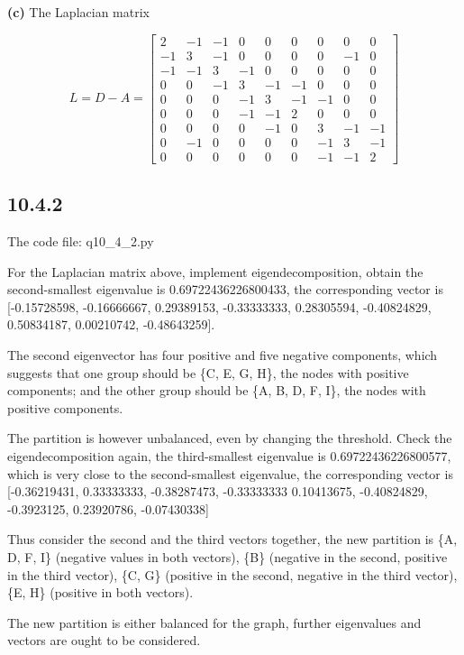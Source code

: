 \documentclass[a4paper, 11pt]{article}
\begin{document}
\textbf{(c)} The Laplacian matrix

$$L = D - A = \begin{bmatrix}
2 &  -1 & -1 & 0 & 0 & 0 & 0 & 0 & 0 \\
-1 & 3 & -1 & 0 & 0 & 0 & 0 & -1 & 0 \\
-1 & -1 & 3 & -1 & 0 & 0 & 0 & 0 & 0 \\
0 & 0 & -1 & 3 & -1 & -1 & 0 & 0 & 0 \\
0 & 0 & 0 & -1 & 3 & -1 & -1 & 0 & 0 \\
0 & 0 & 0 & -1 & -1 & 2 & 0 & 0 & 0 \\
0 & 0 & 0 & 0 & -1 & 0 & 3 & -1 & -1 \\
0 & -1 & 0 & 0 & 0 & 0 & -1 & 3 & -1 \\
0 & 0 & 0 & 0 & 0 & 0 & -1 & -1 & 2
\end{bmatrix}$$


\subsection*{10.4.2} 

The code file: q10\_4\_2.py

For the Laplacian matrix above, implement eigendecomposition, obtain the second-smallest eigenvalue is  0.69722436226800433, the corresponding vector is  [-0.15728598, -0.16666667, 0.29389153, -0.33333333, 0.28305594, -0.40824829,  0.50834187,  0.00210742, -0.48643259].

The second eigenvector has four positive and five negative components, which suggests that one group should be \{C, E, G, H\}, the nodes with positive components; and the other group should be \{A, B, D, F, I\}, the nodes with positive components. 

The partition is however unbalanced, even by changing the threshold. Check the eigendecomposition again, the third-smallest eigenvalue is 0.69722436226800577, which is very close to the second-smallest eigenvalue, the corresponding vector is [-0.36219431,  0.33333333, -0.38287473, -0.33333333  0.10413675, -0.40824829, -0.3923125,  0.23920786, -0.07430338]

Thus consider the second and the third vectors together, the new partition is \{A, D, F, I\} (negative values in both vectors), \{B\} (negative in the second, positive in the third vector), \{C, G\} (positive in the second, negative in the third vector), \{E, H\} (positive in both vectors).

The new partition is either balanced for the graph, further eigenvalues and vectors are ought to be considered.
\end{document}
